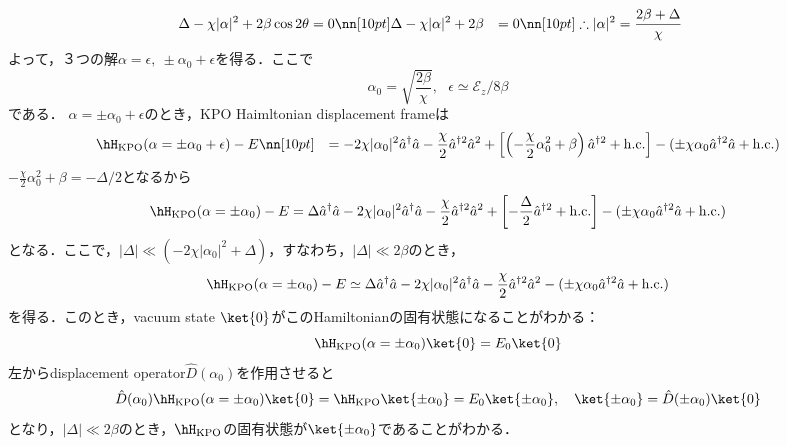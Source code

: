 \begin{align}
    \Delta- \chi|\alpha|^2
    +2\beta\cos{2\theta}&=0\nn[10pt]
    \Delta- \chi|\alpha|^2
    +2\beta&=0\nn[10pt]
    \therefore
    |\alpha|^2
    &=\frac{2\beta+\Delta}{\chi}
\end{align}
よって，３つの解$\alpha=\epsilon,\ \pm\alpha_0+\epsilon$を得る．ここで
\begin{equation}
    \alpha_0 = \sqrt{\frac{2\beta}{\chi}},\ \ \ 
    \epsilon \simeq \mathcal{E}_z/8\beta
\end{equation}
である．
$\alpha=\pm\alpha_0 + \epsilon$のとき，KPO Haimltonian displacement frameは
\begin{align}
    &\hH_{\rm{KPO}}(\alpha=\pm\alpha_0 + \epsilon)-E\nn[10pt]
    &=
    - 2\chi|\alpha_0|^2\hat{a}^{\dagger}\hat{a}
    - \frac{\chi}{2}\hat{a}^{\dagger2}\hat{a}^2
    +\left[\left(- \frac{\chi}{2}\alpha_0^2+\beta\right)\hat{a}^{\dagger2}
    +{\rm{h.c.}}\right]
    - (\pm\chi\alpha_0\hat{a}^{\dagger2}\hat{a} +{\rm{h.c.}} )
\end{align}
$- \frac{\chi}{2}\alpha_0^2+\beta=-\Delta/2$となるから
\begin{equation}
    \hH_{\rm{KPO}}(\alpha=\pm\alpha_0) - E
    =
    \Delta\hat{a}^{\dagger}\hat{a} 
    - 2\chi|\alpha_0|^2\hat{a}^{\dagger}\hat{a}
    - \frac{\chi}{2}\hat{a}^{\dagger2}\hat{a}^2
    +\left[- \frac{\Delta}{2}\hat{a}^{\dagger2}
    +{\rm{h.c.}}\right]
    - (\pm\chi\alpha_0\hat{a}^{\dagger2}\hat{a} +{\rm{h.c.}} )
\end{equation}
となる．ここで，$|\Delta|\ll (-2\chi|\alpha_0|^2+\Delta)$，すなわち，$|\Delta|\ll 2\beta$のとき，
\begin{equation}
    \hH_{\rm{KPO}}(\alpha=\pm\alpha_0) - E
    \simeq
    \Delta\hat{a}^{\dagger}\hat{a} 
    - 2\chi|\alpha_0|^2\hat{a}^{\dagger}\hat{a}
    - \frac{\chi}{2}\hat{a}^{\dagger2}\hat{a}^2
    - (\pm\chi\alpha_0\hat{a}^{\dagger2}\hat{a} +{\rm{h.c.}} )
\end{equation}
を得る．このとき，vacuum state $\ket{0}$がこのHamiltonianの固有状態になることがわかる：
\begin{equation}
    \hH_{\rm{KPO}}(\alpha=\pm\alpha_0)\ket{0}
    =E_0\ket{0}
\end{equation}
左からdisplacement operator$\hat{D}(\alpha_0)$を作用させると
\begin{equation}
    \hat{D}(\alpha_0)\hH_{\rm{KPO}}(\alpha=\pm\alpha_0)\ket{0}
    =\hH_{\rm{KPO}}\ket{\pm\alpha_0}
    =E_0\ket{\pm\alpha_0},\ \ \ \ket{\pm\alpha_0}=\hat{D}(\pm\alpha_0)\ket{0}
\end{equation}
となり，$|\Delta|\ll 2\beta$のとき，$\hH_{\rm{KPO}}$の固有状態が$\ket{\pm\alpha_0}$であることがわかる．


